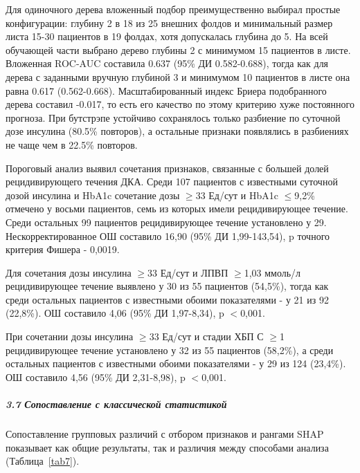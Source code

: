 \documentclass{crm-article}
\begin{document}
Для одиночного дерева вложенный подбор преимущественно выбирал простые конфигурации: глубину 2 в 18 из 25 внешних фолдов и минимальный размер листа 15-30 пациентов в 19 фолдах, хотя допускалась глубина до 5. На всей обучающей части выбрано дерево глубины 2 с минимумом 15 пациентов в листе. Вложенная ROC-AUC составила 0.637 (95\% ДИ 0.582-0.688), тогда как для дерева с заданными вручную глубиной 3 и минимумом 10 пациентов в листе она равна 0.617 (0.562-0.668). Масштабированный индекс Бриера подобранного дерева составил -0.017, то есть его качество по этому критерию хуже постоянного прогноза. При бутстрэпе устойчиво сохранялось только разбиение по суточной дозе инсулина (80.5\% повторов), а остальные признаки появлялись в разбиениях не чаще чем в 22.5\% повторов.

Пороговый анализ выявил сочетания признаков, связанные с большей долей рецидивирующего течения ДКА. Среди 107 пациентов с известными суточной дозой инсулина и HbA1c сочетание дозы $\geq$33 Ед/сут и HbA1c $\leq$9,2\% отмечено у восьми пациентов, семь из которых имели рецидивирующее течение. Среди остальных 99 пациентов рецидивирующее течение установлено у 29. Нескорректированное ОШ составило 16,90 (95\% ДИ 1,99-143,54), p точного критерия Фишера - 0,0019.

Для сочетания дозы инсулина $\geq$33 Ед/сут и ЛПВП $\geq$1,03 ммоль/л рецидивирующее течение выявлено у 30 из 55 пациентов (54,5\%), тогда как среди остальных пациентов с известными обоими показателями - у 21 из 92 (22,8\%). ОШ составило 4,06 (95\% ДИ 1,97-8,34), p $<$0,001.

При сочетании дозы инсулина $\geq$33 Ед/сут и стадии ХБП С $\geq$1 рецидивирующее течение установлено у 32 из 55 пациентов (58,2\%), а среди остальных пациентов с известными обоими показателями - у 29 из 124 (23,4\%). ОШ составило 4,56 (95\% ДИ 2,31-8,98), p $<$0,001.

\subparagraph{3.7 Сопоставление с классической статистикой}\label{subsec3_7}

Сопоставление групповых различий с отбором признаков и рангами SHAP показывает как общие результаты, так и различия между способами анализа (Таблица~\ref{tab7}).
\end{document}
